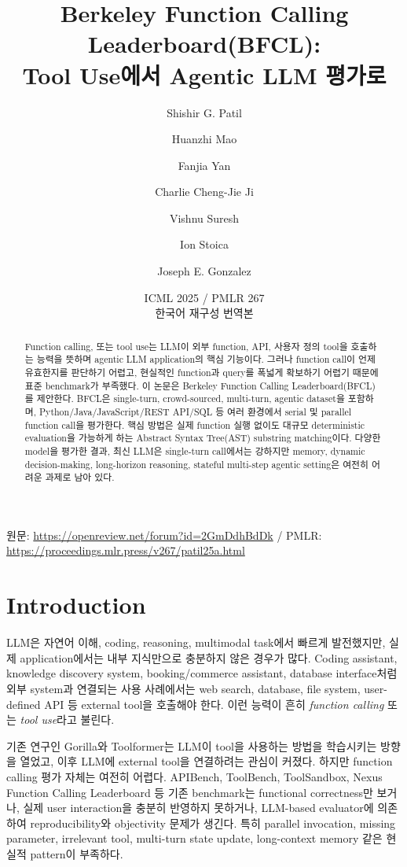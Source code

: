 \documentclass[11pt]{article}
\title{Berkeley Function Calling Leaderboard(BFCL):\\Tool Use에서 Agentic LLM 평가로}
\author{Shishir G. Patil \and Huanzhi Mao \and Fanjia Yan \and Charlie Cheng-Jie Ji \and Vishnu Suresh \and Ion Stoica \and Joseph E. Gonzalez}
\date{ICML 2025 / PMLR 267\\한국어 재구성 번역본}
\begin{document}
\maketitle
\begin{center}
\small 원문: \url{https://openreview.net/forum?id=2GmDdhBdDk} / PMLR: \url{https://proceedings.mlr.press/v267/patil25a.html}
\end{center}

\begin{abstract}
Function calling, 또는 tool use는 LLM이 외부 function, API, 사용자 정의 tool을 호출하는 능력을 뜻하며 agentic LLM application의 핵심 기능이다. 그러나 function call이 언제 유효한지를 판단하기 어렵고, 현실적인 function과 query를 폭넓게 확보하기 어렵기 때문에 표준 benchmark가 부족했다. 이 논문은 Berkeley Function Calling Leaderboard(BFCL)를 제안한다. BFCL은 single-turn, crowd-sourced, multi-turn, agentic dataset을 포함하며, Python/Java/JavaScript/REST API/SQL 등 여러 환경에서 serial 및 parallel function call을 평가한다. 핵심 방법은 실제 function 실행 없이도 대규모 deterministic evaluation을 가능하게 하는 Abstract Syntax Tree(AST) substring matching이다. 다양한 model을 평가한 결과, 최신 LLM은 single-turn call에서는 강하지만 memory, dynamic decision-making, long-horizon reasoning, stateful multi-step agentic setting은 여전히 어려운 과제로 남아 있다.
\end{abstract}

\tableofcontents
\newpage

\section{Introduction}
LLM은 자연어 이해, coding, reasoning, multimodal task에서 빠르게 발전했지만, 실제 application에서는 내부 지식만으로 충분하지 않은 경우가 많다. Coding assistant, knowledge discovery system, booking/commerce assistant, database interface처럼 외부 system과 연결되는 사용 사례에서는 web search, database, file system, user-defined API 등 external tool을 호출해야 한다. 이런 능력이 흔히 \emph{function calling} 또는 \emph{tool use}라고 불린다.

기존 연구인 Gorilla와 Toolformer는 LLM이 tool을 사용하는 방법을 학습시키는 방향을 열었고, 이후 LLM에 external tool을 연결하려는 관심이 커졌다. 하지만 function calling 평가 자체는 여전히 어렵다. APIBench, ToolBench, ToolSandbox, Nexus Function Calling Leaderboard 등 기존 benchmark는 functional correctness만 보거나, 실제 user interaction을 충분히 반영하지 못하거나, LLM-based evaluator에 의존하여 reproducibility와 objectivity 문제가 생긴다. 특히 parallel invocation, missing parameter, irrelevant tool, multi-turn state update, long-context memory 같은 현실적 pattern이 부족하다.
\end{document}
